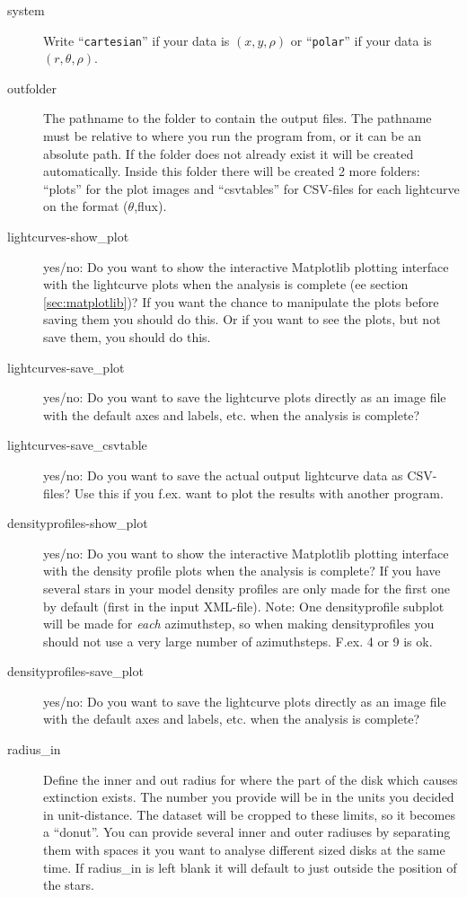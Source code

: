 \documentclass[a4paper, 12pt, english, titlepage]{article}
\begin{document}
\begin{description}
        \item[system]
            Write ``\texttt{cartesian}'' if your data is $(x,y,\rho)$ or ``\texttt{polar}'' if your data is $(r,\theta,\rho)$.
        \item[outfolder]
            The pathname to the folder to contain the output files. The pathname must be relative to where you run the program from, or it can be an absolute path. If the folder does not already exist it will be created automatically. Inside this folder there will be created 2 more folders: ``plots'' for the plot images and ``csvtables'' for CSV-files for each lightcurve on the format ($\theta$,flux).
        \item[lightcurves-show\_plot]
            yes/no: Do you want to show the interactive Matplotlib plotting interface with the lightcurve plots when the analysis is complete (ee section \vref{sec:matplotlib})? If you want the chance to manipulate the plots before saving them you should do this. Or if you want to see the plots, but not save them, you should do this.
        \item[lightcurves-save\_plot]
            yes/no: Do you want to save the lightcurve plots directly as an image file with the default axes and labels, etc. when the analysis is complete?
        \item[lightcurves-save\_csvtable]
            yes/no: Do you want to save the actual output lightcurve data as CSV-files? Use this if you f.ex. want to plot the results with another program.
        \item[densityprofiles-show\_plot]
            yes/no: Do you want to show the interactive Matplotlib plotting interface with the density profile plots when the analysis is complete? If you have several stars in your model density profiles are only made for the first one by default (first in the input XML-file). Note: One densityprofile subplot will be made for \emph{each} azimuthstep, so when making densityprofiles you should not use a very large number of azimuthsteps. F.ex. 4 or 9 is ok.
        \item[densityprofiles-save\_plot]
            yes/no: Do you want to save the lightcurve plots directly as an image file with the default axes and labels, etc. when the analysis is complete?
        \item[radius\_in]
            Define the inner and out radius for where the part of the disk which causes extinction exists. The number you provide will be in the units you decided in unit-distance. The dataset will be cropped to these limits, so it becomes a ``donut''. You can provide several inner and outer radiuses by separating them with spaces it you want to analyse different sized disks at the same time. If radius\_in is left blank it will default to just outside the position of the stars.

\end{description}
\end{document}
